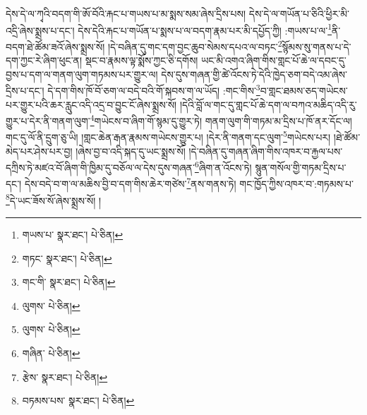 དེས་དེ་ལ་ཀྭའི་བདག་གི་ཨོ་བོའི་རྐང་པ་གཡས་པ་མ་སྨས་སམ་ཞེས་དྲིས་པས། དེས་དེ་ལ་གཡོན་པ་ཅིའི་ཕྱིར་མི་འདྲི་ཞེས་སྨྲས་པ་དང་། དེས་དེའི་རྐང་པ་གཡོན་པ་སྨས་པ་ལ་བདག་རྣམ་པར་མི་དཔྱོད་ཀྱི། :གཡས་པ་ལ་\footnote{གཡས་པ་  སྣར་ཐང་།  པེ་ཅིན། }ནི་བདག་ཐེ་ཚོམ་ཟའོ་ཞེས་སྨྲས་སོ། །དེ་བཞིན་དུ་གང་དག་བྱང་ཆུབ་སེམས་དཔའ་ལ་བཏང་\footnote{གཏང་  སྣར་ཐང་།  པེ་ཅིན། }སྙོམས་སུ་གནས་པ་དེ་དག་ཀྱང་རེ་ཞིག་ཕུང་ན། སྡང་བ་རྣམས་ལྟ་སྨོས་ཀྱང་ཅི་དགོས། ཡང་མི་འགའ་ཞིག་གིས་གླང་པོ་ཆེ་ལ་དབང་དུ་བྱས་པ་དག་ལ་གནག་ལུག་གཏམས་པར་གྱུར་ལ། དེས་དུས་གཞན་གྱི་ཚེ་འོངས་ཏེ་དེའི་ཁྱེད་ཅག་བདེ་འམ་ཞེས་དྲིས་པ་དང་། དེ་དག་གིས་ཁོ་བོ་ཅག་ལ་བདེ་བའི་གོ་སྐབས་ག་ལ་ཡོད། :གང་གིས་\footnote{གང་གི་  སྣར་ཐང་།  པེ་ཅིན། }བ་གླང་ཐམས་ཅད་གཡེངས་པར་གྱུར་པའི་ཆར་རླུང་འདི་འདྲ་བ་བྱུང་ངོ་ཞེས་སྨྲས་སོ། །དེའི་བློ་ལ་གང་དུ་གླང་པོ་ཆེ་དག་ལ་བཀའ་མཆིད་འདི་རུ་གྱུར་པ་དེར་ནི་གནག་ལུག་\footnote{ལུགས་  པེ་ཅིན། }གཡེངས་བ་ཞིག་གོ་སྙམ་དུ་གྱུར་ཏེ། གནག་ལུག་གི་གཏམ་མ་དྲིས་པ་ཁོ་ནར་དོང་ལ། གང་དུ་ལོ་ནི་དྲུག་ཅུ་ཡི། །གླང་ཆེན་རྒན་རྣམས་གཡེངས་གྱུར་པ། །དེར་ནི་གནག་དང་ལུག་\footnote{ལུགས་  པེ་ཅིན། }གཡེངས་པར། །ཐེ་ཚོམ་མེད་པར་ཤེས་པར་བྱ། །ཞེས་བྱ་བ་འདི་སྐད་དུ་ཡང་སྨྲས་སོ། །དེ་བཞིན་དུ་གཞན་ཞིག་གིས་འཁར་བ་རྐྱལ་པས་དཀྲིས་ཏེ་མཛའ་བོ་ཞིག་གི་ཁྱིམ་དུ་བཅོལ་ལ་དེས་དུས་གཞན་\footnote{གཞིན་  པེ་ཅིན། }ཞིག་ན་འོངས་ཏེ། སྙུན་གསོལ་གྱི་གཏམ་དྲིས་པ་དང་། དེས་བདེ་བ་ག་ལ་མཆིས་བྱི་བ་དག་གིས་ཆེར་གཙེས་\footnote{རྩེས་  སྣར་ཐང་།  པེ་ཅིན། }ནས་གནས་ཏེ། གང་ཁྱོད་ཀྱིས་འཁར་བ་:གཏམས་པ་\footnote{བཏམས་པས་  སྣར་ཐང་།  པེ་ཅིན། }དེ་ཡང་ཟོས་སོ་ཞེས་སྨྲས་སོ། །

